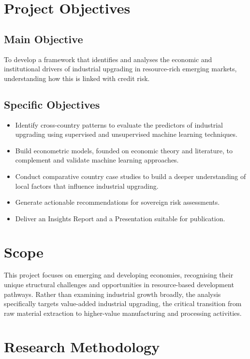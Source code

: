 \documentclass[12pt,a4paper]{report}
\begin{document}
\section*{Project Objectives}

\subsection*{Main Objective}

To develop a framework that identifies and analyses the economic and institutional drivers of industrial upgrading in resource-rich emerging markets, understanding how this is linked with credit risk.

\subsection*{Specific Objectives}

\begin{itemize}
\item Identify cross-country patterns to evaluate the predictors of industrial upgrading using supervised and unsupervised machine learning techniques.
\item Build econometric models, founded on economic theory and literature, to complement and validate machine learning approaches.
\item Conduct comparative country case studies to build a deeper understanding of local factors that influence industrial upgrading.
\item Generate actionable recommendations for sovereign risk assessments.
\item Deliver an Insights Report and a Presentation suitable for publication.
\end{itemize}

\section*{Scope}

This project focuses on emerging and developing economies, recognising their unique structural challenges and opportunities in resource-based development pathways. Rather than examining industrial growth broadly, the analysis specifically targets value-added industrial upgrading, the critical transition from raw material extraction to higher-value manufacturing and processing activities.

\section*{Research Methodology}
\end{document}
